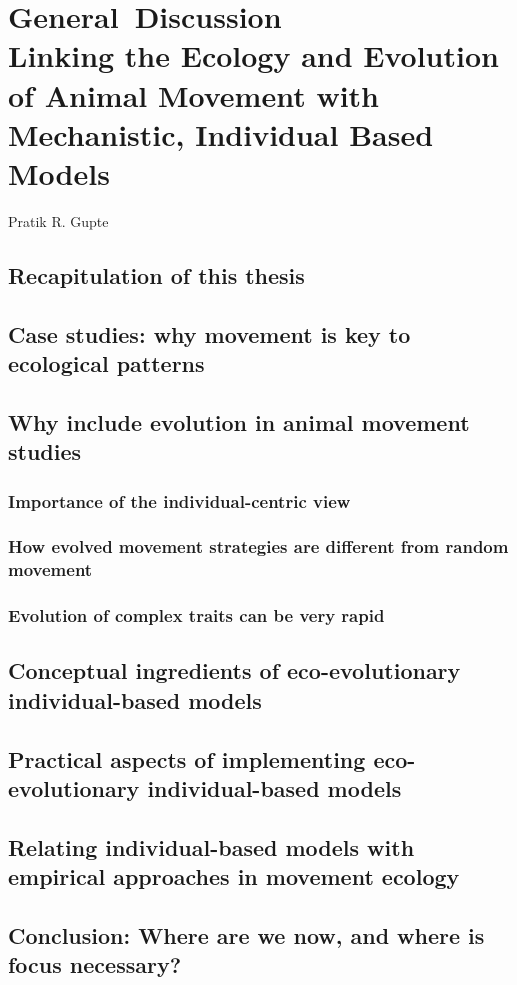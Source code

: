 
\chapter{{\color{gray}General~Discussion}\\Linking the Ecology and Evolution of Animal Movement with Mechanistic, Individual Based Models}

{{Pratik R. Gupte}}

\section*{Recapitulation of this thesis}

\section*{Case studies: why movement is key to ecological patterns}

\section*{Why include evolution in animal movement studies}

\subsection*{Importance of the individual-centric view}

\subsection*{How evolved movement strategies are different from random movement}

\subsection*{Evolution of complex traits can be very rapid}

\section*{Conceptual ingredients of eco-evolutionary individual-based models}

\section*{Practical aspects of implementing eco-evolutionary individual-based models}

\section*{Relating individual-based models with empirical approaches in movement ecology}

\section*{Conclusion: Where are we now, and where is focus necessary?}
